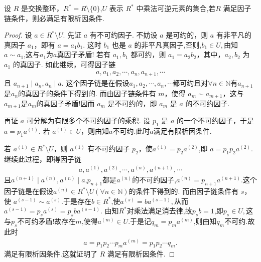\documentclass[../../main.tex]{subfiles}%
\begin{document}
\begin{lemma}\label{lemma:抽象代数--引理2.2.3}
设 \( R \) 是交换整环，\( R^* = R \setminus \{0\} \),\( U \) 表示 \( R^* \) 中乘法可逆元素的集合,若\( R \) 满足因子链条件，则必满足有限析因条件.
\end{lemma}
\begin{proof}

设 \( a \in R^* \setminus U \). 先证 \( a \) 有不可约因子. 不妨设 \( a \) 是可约的，则 \( a \) 有非平凡的真因子 \( a_1 \)，即有 \( a = a_1b_1 \). 这时 \( b_1 \) 也是 \( a \) 的非平凡真因子,否则,$b_1\in U,$由知$a\sim a_1$,这与$a_1$为$a$真因子矛盾! 若有 \( a_1, b_1 \) 都可约，则 \( a_1 = a_2b_2 \)，其中，\( a_2, b_2 \) 为 \( a_1 \) 的真因子. 如此继续，可得因子链
\begin{align*}
a, a_1, a_2, \cdots, a_n, a_{n+1}, \cdots
\end{align*}
且 \( a_{n+1} \mid a_n,a_n\mid a\). 
这个因子链是在假设$a_1,a_2,\cdots,a_n,\cdots$都可约且对$\forall n\in \mathbb{N}$有$a_{n+1}$是$a_n$的真因子的条件下得到的.
而由因子链条件有 \( m \)，使得 \( a_m \sim a_{m+1} \)，这与$a_{m+1}$是$a_m$的真因子矛盾!因而 \( a_m \) 是不可约的，即 \( a_m \) 是 \( a \) 的不可约因子.

再证 \( a \) 可分解为有限多个不可约因子的乘积. 设 \( p_1 \) 是 \( a \) 的一个不可约因子，于是 \( a = p_1a^{(1)} \). 若 \( a^{(1)} \in U \)，则由知$a$不可约.此时$a$满足有限析因条件.

若 \( a^{(1)} \in R^* \setminus U \)，则 \( a^{(1)} \) 有不可约因子 \( p_2 \)，使$a^{(1)}=p_2a^{(2)}$,即 \( a = p_1p_2a^{(2)} \). 继续此过程，即得因子链
\begin{align*}
a, a^{(1)}, a^{(2)}, \cdots, a^{(n)}, a^{(n+1)}, \cdots
\end{align*}
且\( a^{(n+1)} \mid a^{(n)},a^{(n)}\mid a\),$p_{n+1}$都是$a^{(n)}$的不可约因子,$a^{(n)}=p_{n+1}a^{(n+1)}$.这个因子链是在假设$a^{(n)}\in R^*\setminus U(\forall n\in \mathbb{N})$的条件下得到的.
而由因子链条件有 \( s \)，使 \( a^{(s-1)} \sim a^{(s)} \).于是存在$b\in R^*$,使$a^{(s)}=ba^{(s-1)},$从而
$a^{\left( s-1 \right)}=p_sa^{\left( s \right)}=p_sba^{\left( s-1 \right)}$.
由知$R^*$对乘法满足消去律,故$p_sb=1$,即$p_s\in U,$这与$p_s$不可约矛盾!故存在$m$,使得$a^{(m)}\in U.$于是记$q_m = p_ma^{(m)}$,则由知$q_m$不可约.故此时
\begin{align*}
a = p_1p_2\cdots p_m a^{(m)}=p_1p_2\cdots q_m.
\end{align*}
满足有限析因条件.这就证明了 \( R \) 满足有限析因条件.

\end{proof}
\end{document}
